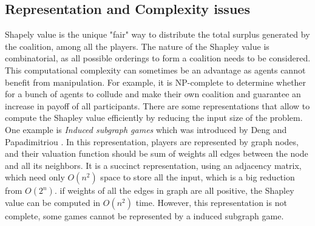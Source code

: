 


        \subsection{Representation and Complexity issues}\label{sec:CWSArchitecture}

        Shapely value is the unique "fair" way to distribute the total surplus generated by the coalition, among all the players.
        The nature of the Shapley value is combinatorial, as all possible orderings to form a
        coalition needs to be considered. This computational complexity can sometimes be
        an advantage as agents cannot benefit from manipulation. For example, it is NP-complete
        to determine whether for a bunch of agents to collude and make their own coalition and guarantee
        an increase in payoff of all participants\cite{conf/aaai/YokooCSOI05}.
        There are some representations that allow to compute the Shapley value efficiently by reducing the input size of the problem.
        One example is \emph{Induced subgraph games}
        which was introduced by Deng and Papadimitriou \cite{Deng94}. In this representation, players are represented by graph nodes, and
        their valuation function should be sum of weights all edges between the node and all its neighbors. It is a succinct representation, using
        an adjacency matrix, which need only $O(n^2)$ space to store all the input, which is a big reduction from $O(2^n)$.
        if weights of all the edges in graph are all positive, the Shapley value can be computed in $O(n^2)$ time.
        However, this representation is not complete, some games cannot be represented by a induced subgraph game\cite{conf/aaai/YokooCSOI05}.

